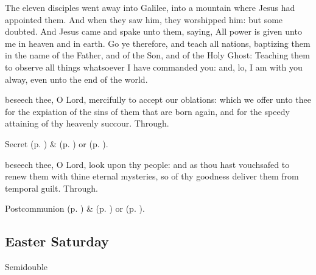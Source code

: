  The eleven disciples went away into Galilee, into a mountain where Jesus had appointed them. And when they saw him, they worshipped him: but some doubted. And Jesus came and spake unto them, saying, All power is given unto me in heaven and in earth. Go ye therefore, and teach all nations, baptizing them in the name of the Father, and of the Son, and of the Holy Ghost: Teaching them to observe all things whatsoever I have commanded you: and, lo, I am with you alway, even unto the end of the world.


\secret
{} beseech thee, O Lord, mercifully to accept our oblations: which we offer unto thee for the expiation of the sins of them that are born again, and for the speedy attaining of thy heavenly succour. Through.
\begin{rubric}
     Secret  (p. \pageref{EasterSecret}) \&   (p. \pageref{SPAgainst}) or  (p. \pageref{SPChiefBishop}).
\end{rubric}



\postcommunion
{} beseech thee, O Lord, look upon thy people: and as thou hast vouchsafed to renew them with thine eternal mysteries, so of thy goodness deliver them from temporal guilt. Through.
\begin{rubric}
     Postcommunion  (p. \pageref{EasterPostcommunion}) \&   (p. \pageref{SPAgainst}) or  (p. \pageref{SPChiefBishop}).
\end{rubric}


\subsection{Easter Saturday}
\begin{inhead}
    {Semidouble}
\end{inhead}

